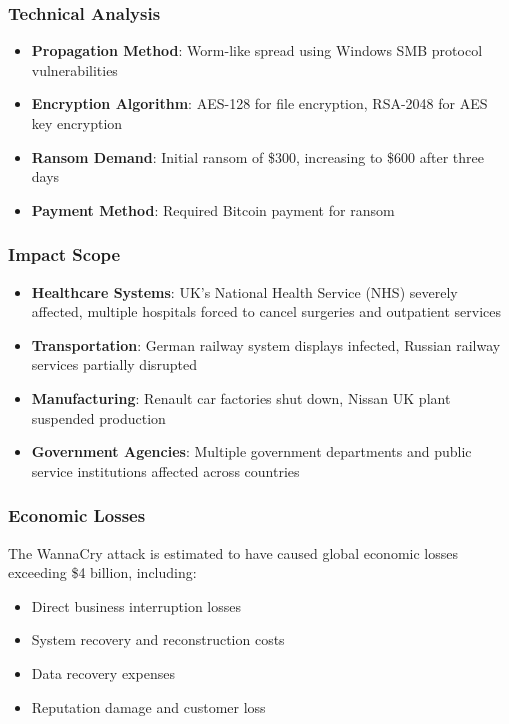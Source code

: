 \documentclass[12pt,a4paper]{article}
\begin{document}
\subsubsection{Technical Analysis}
\begin{itemize}
    \item \textbf{Propagation Method}: Worm-like spread using Windows SMB protocol vulnerabilities
    \item \textbf{Encryption Algorithm}: AES-128 for file encryption, RSA-2048 for AES key encryption
    \item \textbf{Ransom Demand}: Initial ransom of \$300, increasing to \$600 after three days
    \item \textbf{Payment Method}: Required Bitcoin payment for ransom
\end{itemize}

\subsubsection{Impact Scope}
\begin{itemize}
    \item \textbf{Healthcare Systems}: UK's National Health Service (NHS) severely affected, multiple hospitals forced to cancel surgeries and outpatient services
    \item \textbf{Transportation}: German railway system displays infected, Russian railway services partially disrupted
    \item \textbf{Manufacturing}: Renault car factories shut down, Nissan UK plant suspended production
    \item \textbf{Government Agencies}: Multiple government departments and public service institutions affected across countries
\end{itemize}

\subsubsection{Economic Losses}
The WannaCry attack is estimated to have caused global economic losses exceeding \$4 billion, including:
\begin{itemize}
    \item Direct business interruption losses
    \item System recovery and reconstruction costs
    \item Data recovery expenses
    \item Reputation damage and customer loss
\end{itemize}
\end{document}
